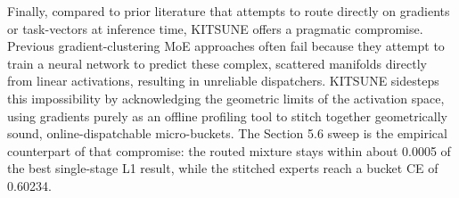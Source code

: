 Finally, compared to prior literature that attempts to route directly on gradients or task-vectors at inference time, KITSUNE offers a pragmatic compromise. Previous gradient-clustering MoE approaches often fail because they attempt to train a neural network to predict these complex, scattered manifolds directly from linear activations, resulting in unreliable dispatchers. KITSUNE sidesteps this impossibility by acknowledging the geometric limits of the activation space, using gradients purely as an offline profiling tool to stitch together geometrically sound, online-dispatchable micro-buckets. The Section 5.6 sweep is the empirical counterpart of that compromise: the routed mixture stays within about 0.0005 of the best single-stage L1 result, while the stitched experts reach a bucket CE of 0.60234.
